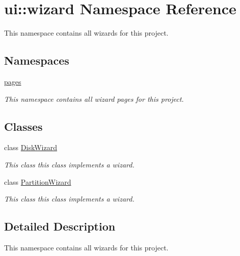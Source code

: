\hypertarget{namespaceui_1_1wizard}{}\section{ui\+:\+:wizard Namespace Reference}
\label{namespaceui_1_1wizard}


This namespace contains all wizards for this project.  


\subsection*{Namespaces}
\begin{DoxyCompactItemize}
\item 
 \mbox{\hyperlink{namespaceui_1_1wizard_1_1pages}{pages}}
\begin{DoxyCompactList}\small\item\em This namespace contains all wizard pages for this project. \end{DoxyCompactList}\end{DoxyCompactItemize}
\subsection*{Classes}
\begin{DoxyCompactItemize}
\item 
class \mbox{\hyperlink{classui_1_1wizard_1_1_disk_wizard}{Disk\+Wizard}}
\begin{DoxyCompactList}\small\item\em This class this class implements a wizard. \end{DoxyCompactList}\item 
class \mbox{\hyperlink{classui_1_1wizard_1_1_partition_wizard}{Partition\+Wizard}}
\begin{DoxyCompactList}\small\item\em This class this class implements a wizard. \end{DoxyCompactList}\end{DoxyCompactItemize}


\subsection{Detailed Description}
This namespace contains all wizards for this project. 